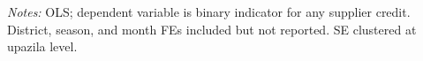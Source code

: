 \documentclass[authoryear,preprint,review,12pt]{elsarticle}
\begin{document}
\begin{table}[htbp]
  \centering
  \caption{First-Stage Regression: LOO Credit Rate Instrument}
  \label{tab:firststage}
  \begin{singlespace}
  \begin{threeparttable}
    
    \begin{tablenotes}\footnotesize
      \item \textit{Notes:} OLS; dependent variable is binary indicator for
      any supplier credit. District, season, and month FEs included but not
      reported. SE clustered at upazila level.
    \end{tablenotes}
  \end{threeparttable}
  \end{singlespace}
\end{table}
\end{document}
